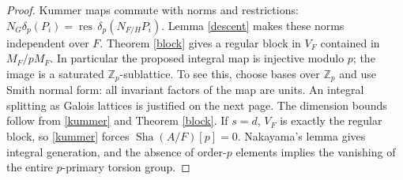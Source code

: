 \documentclass[11pt,a4paper]{article}
\newcommand{\Zp}{\mathbb Z_p}\newcommand{\Qp}{\mathbb Q_p}\newcommand{\Fp}{\mathbb F_p}\newcommand{\Q}{\mathbb Q}\newcommand{\Sha}{\operatorname{Sha}}\newcommand{\Sel}{\operatorname{Sel}}\newcommand{\Gal}{\operatorname{Gal}}\newcommand{\Tr}{\operatorname{Tr}}\newcommand{\rk}{\operatorname{rank}}\newcommand{\ord}{\operatorname{ord}}\newcommand{\Hom}{\operatorname{Hom}}\newcommand{\SL}{\operatorname{SL}}\newcommand{\GL}{\operatorname{GL}}\newcommand{\coker}{\operatorname{coker}}\newcommand{\length}{\operatorname{length}}\newcommand{\res}{\operatorname{res}}\newcommand{\cor}{\operatorname{cor}}\newcommand{\Id}{\operatorname{id}}
\numberwithin{equation}{section}
\begin{document}
\begin{proof}
Kummer maps commute with norms and restrictions: $N_G\delta_p(P_i)=\res\,\delta_p(N_{F/H}P_i)$. Lemma \ref{descent} makes these norms independent over $F$. Theorem \ref{block} gives a regular block in $V_F$ contained in $M_F/pM_F$. In particular the proposed integral map is injective modulo $p$; the image is a saturated $\Zp$-sublattice. To see this, choose bases over $\Zp$ and use Smith normal form: all invariant factors of the map are units. An integral splitting as Galois lattices is justified on the next page. The dimension bounds follow from \eqref{kummer} and Theorem \ref{block}. If $s=d$, $V_F$ is exactly the regular block, so \eqref{kummer} forces $\Sha(A/F)[p]=0$. Nakayama's lemma gives integral generation, and the absence of order-$p$ elements implies the vanishing of the entire $p$-primary torsion group.
\end{proof}
\end{document}

